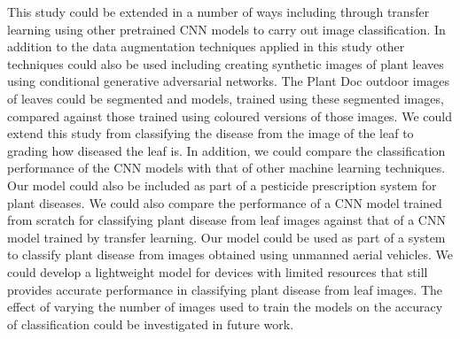 \documentclass[conference]{IEEEtran}
\begin{document}
This study could be extended in a number of ways including through transfer learning using other pretrained CNN models to carry out image classification. In addition to the data augmentation techniques applied in this study other techniques could also be used including creating synthetic images of plant leaves using conditional generative adversarial networks. The Plant Doc outdoor images of leaves could be segmented and models, trained using these segmented images, compared against those trained using coloured versions of those images. We could extend this study from classifying the disease from the image of the leaf to grading how diseased the leaf is. In addition, we could compare the classification performance of the CNN models with that of other machine learning techniques. Our model could also be included as part of a pesticide prescription system for plant diseases. We could also compare the performance of a CNN model trained from scratch for classifying plant disease from leaf images against that of a CNN model trained by transfer learning. Our model could be used as part of a system to classify plant disease from images obtained using unmanned aerial vehicles. We could develop a lightweight model for devices with limited resources that still provides accurate performance in classifying plant disease from leaf images. The effect of varying the number of images used to train the models on the accuracy of classification could be investigated in future work.         




\end{document}
